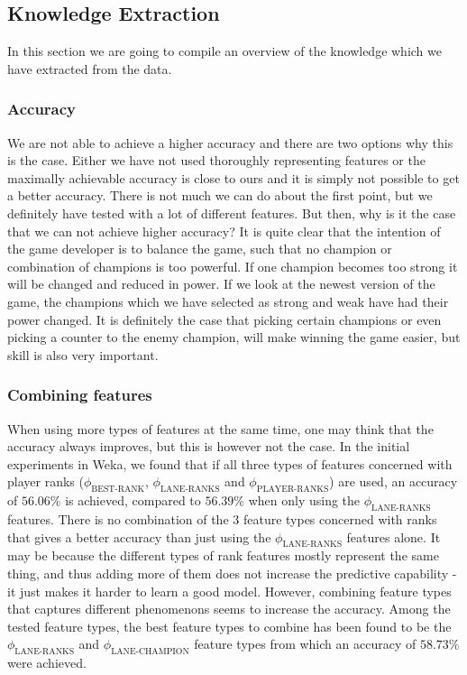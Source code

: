 \subsection{Knowledge Extraction}\label{sub:knowledge}
In this section we are going to compile an overview of the knowledge which we have extracted from the data. 

\subsubsection{Accuracy}
We are not able to achieve a higher accuracy and there are two options why this is the case. Either we have not used thoroughly representing features or the maximally achievable accuracy is close to ours and it is simply not possible to get a better accuracy. There is not much we can do about the first point, but we definitely have tested with a lot of different features. But then, why is it the case that we can not achieve higher accuracy? It is quite clear that the intention of the game developer is to balance the game, such that no champion or combination of champions is too powerful. If one champion becomes too strong it will be changed and reduced in power. If we look at the newest version of the game, the champions which we have selected as strong and weak have had their power changed. It is definitely the case that picking certain champions or even picking a counter to the enemy champion, will make winning the game easier, but skill is also very important. 

\subsubsection{Combining features}
When using more types of features at the same time, one may think that the accuracy always improves, but this is however not the case.
In the initial experiments in Weka, we found that if all three types of features concerned with player ranks ($\phi_\text{BEST-RANK}$, $\phi_\text{LANE-RANKS}$ and $\phi_\text{PLAYER-RANKS}$) are used, an accuracy of $56.06\%$ is achieved, compared to $56.39\%$ when only using the $\phi_\text{LANE-RANKS}$ features. There is no combination of the 3 feature types concerned with ranks that gives a better accuracy than just using the $\phi_\text{LANE-RANKS}$ features alone. It may be because the different types of rank features mostly represent the same thing, and thus adding more of them does not increase the predictive capability - it just makes it harder to learn a good model.
However, combining feature types that captures different phenomenons seems to increase the accuracy.
Among the tested feature types, the best feature types to combine has been found to be the $\phi_\text{LANE-RANKS}$ and $\phi_\text{LANE-CHAMPION}$ feature types from which an accuracy of $58.73 \%$ were achieved.


